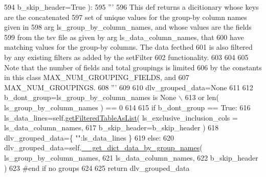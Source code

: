 \begin{DoxyCode}
594                                         b\_skip\_header=\textcolor{keyword}{True} ):
595         \textcolor{stringliteral}{'''}
596 \textcolor{stringliteral}{        This def returns a dicitionary whose keys are the concatenated}
597 \textcolor{stringliteral}{        set of unique values for the group-by column names given in}
598 \textcolor{stringliteral}{        arg ls\_group\_by\_column\_names, and whose values are the fields}
599 \textcolor{stringliteral}{        from the tsv file as given by arg ls\_data\_column\_names, that}
600 \textcolor{stringliteral}{        have matching values for the group-by columns. The data fecthed}
601 \textcolor{stringliteral}{        is also filtered by any existing filters as added by the setFilter}
602 \textcolor{stringliteral}{        functionality.}
603 \textcolor{stringliteral}{}
604 \textcolor{stringliteral}{}
605 \textcolor{stringliteral}{        Note that the number of fields and total groupings is limited }
606 \textcolor{stringliteral}{        by the constants in this class MAX\_NUM\_GROUPING\_FIELDS, and }
607 \textcolor{stringliteral}{        MAX\_NUM\_GROUPINGS.}
608 \textcolor{stringliteral}{        '''}
609 
610         dlv\_grouped\_data=\textcolor{keywordtype}{None}
611 
612         b\_dont\_group=ls\_group\_by\_column\_names \textcolor{keywordflow}{is} \textcolor{keywordtype}{None} \(\backslash\)
613                     \textcolor{keywordflow}{or} len( ls\_group\_by\_column\_names ) == 0
614 
615         \textcolor{keywordflow}{if} b\_dont\_group == \textcolor{keyword}{True}:
616             ls\_data\_lines=self.\hyperlink{classnegui_1_1pgneestimationtablefilemanager_1_1NeEstimationTableFileManager_adb06c0cd0ae4870590638905c8ea05a9}{getFilteredTableAsList}( ls\_exclusive\_inclusion\_cols = 
      ls\_data\_column\_names,
617                                                                         b\_skip\_header=b\_skip\_header )
618             dlv\_grouped\_data=\{ \textcolor{stringliteral}{""}:ls\_data\_lines \}
619         \textcolor{keywordflow}{else}:
620             dlv\_grouped\_data=self.\hyperlink{classnegui_1_1pgneestimationtablefilemanager_1_1NeEstimationTableFileManager_a4f12b5a76561f93307099d713d244ead}{\_\_get\_dict\_data\_by\_group\_names}( 
      ls\_group\_by\_column\_names,
621                                                                     ls\_data\_column\_names,
622                                                                     b\_skip\_header )
623         \textcolor{comment}{#end if no groups}
624 
625         \textcolor{keywordflow}{return} dlv\_grouped\_data
\end{DoxyCode}
